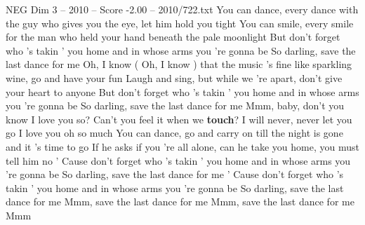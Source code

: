 \begin{textsample}{NEG Dim 3 – 2010 – Score -2.00 – 2010/722.txt}  \label{ex:f3_neg_023}
You can dance, every dance with the guy who gives you the eye, let him hold you tight You can smile, every smile for the man who held your hand beneath the pale moonlight But don't forget who 's takin ' you home and in whose arms you 're gonna be So darling, save the last dance for me Oh, I know ( Oh, I know ) that the music 's fine like sparkling wine, go and have your fun Laugh and sing, but while we 're apart, don't give your heart to anyone But don't forget who 's takin ' you home and in whose arms you 're gonna be So darling, save the last dance for me Mmm, baby, don't you know I love you so?
Can't you feel it when we \textbf{touch}?
I will never, never let you go I love you oh so much You can dance, go and carry on till the night is gone and it 's time to go If he asks if you 're all alone, can he take you home, you must tell him no ' Cause don't forget who 's takin ' you home and in whose arms you 're gonna be So darling, save the last dance for me ' Cause don't forget who 's takin ' you home and in whose arms you 're gonna be So darling, save the last dance for me Mmm, save the last dance for me Mmm, save the last dance for me Mmm

\end{textsample}
